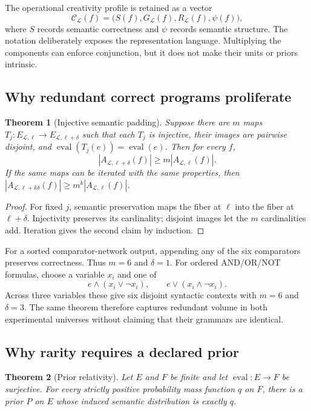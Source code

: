 \documentclass[10pt]{article}
\newtheorem{theorem}{Theorem}
\theoremstyle{definition}
\begin{document}
The operational creativity profile is retained as a vector
\[
 \mathcal C_{\mathcal L}(f)
 =\bigl(S(f),G_{\mathcal L}(f),R_{\mathcal L}(f),\psi(f)\bigr),
 \tag{4}
\]
where $S$ records semantic correctness and $\psi$ records semantic structure.
The notation deliberately exposes the representation language.  Multiplying
the components can enforce conjunction, but it does not make their units or
priors intrinsic.

\subsection{Why redundant correct programs proliferate}

\begin{theorem}[Injective semantic padding]
Suppose there are $m$ maps
$T_j:E_{\mathcal L,\ell}\to E_{\mathcal L,\ell+\delta}$ such that each $T_j$
is injective, their images are pairwise disjoint, and
$\operatorname{eval}(T_j(e))=\operatorname{eval}(e)$.  Then for every $f$,
\[
 |A_{\mathcal L,\ell+\delta}(f)|\ge
 m|A_{\mathcal L,\ell}(f)|.
 \tag{5}
\]
If the same maps can be iterated with the same properties, then
$|A_{\mathcal L,\ell+k\delta}(f)|\ge m^k|A_{\mathcal L,\ell}(f)|$.
\end{theorem}

\begin{proof}
For fixed $j$, semantic preservation maps the fiber at $\ell$ into the fiber
at $\ell+\delta$.  Injectivity preserves its cardinality; disjoint images let
the $m$ cardinalities add.  Iteration gives the second claim by induction.
\end{proof}

For a sorted comparator-network output, appending any of the six comparators
preserves correctness.  Thus $m=6$ and $\delta=1$.  For ordered AND/OR/NOT
formulas, choose a variable $x_i$ and one of
\[
 e\land(x_i\lor\neg x_i),\qquad e\lor(x_i\land\neg x_i).
 \tag{6}
\]
Across three variables these give six disjoint syntactic contexts with
$m=6$ and $\delta=3$.  The same theorem therefore captures redundant volume
in both experimental universes without claiming that their grammars are
identical.

\subsection{Why rarity requires a declared prior}

\begin{theorem}[Prior relativity]
Let $E$ and $F$ be finite and let $\operatorname{eval}:E\to F$ be surjective.
For every strictly positive probability mass function $q$ on $F$, there is a
prior $P$ on $E$ whose induced semantic distribution is exactly $q$.
\end{theorem}
\end{document}
